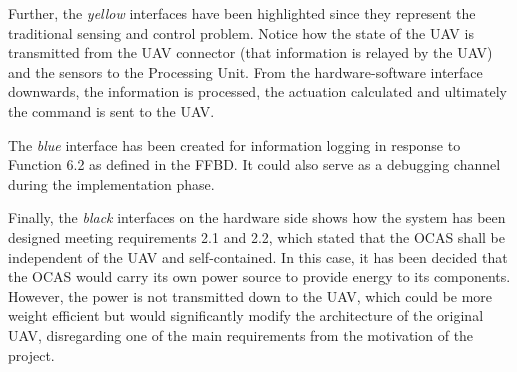 Further, the \emph{yellow} interfaces have been highlighted since they represent the traditional sensing and control problem.
Notice how the state of the UAV is transmitted from the UAV connector (that information is relayed by the UAV) and the sensors to the Processing Unit.
From the hardware-software interface downwards, the information is processed, the actuation calculated and ultimately the command is sent to the UAV. 

The \emph{blue} interface has been created for information logging in response to Function 6.2 as defined in the FFBD.
It could also serve as a debugging channel during the implementation phase.

Finally, the \emph{black} interfaces on the hardware side shows how the system has been designed meeting requirements 2.1 and 2.2, which stated that the OCAS shall be independent of the UAV and self-contained.
In this case, it has been decided that the OCAS would carry its own power source to provide energy to its components.
However, the power is not transmitted down to the UAV, which could be more weight efficient but would significantly modify the architecture of the original UAV, disregarding one of the main requirements from the motivation of the project.



